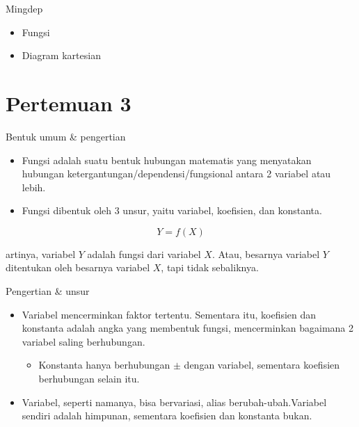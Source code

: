 \documentclass[
  ignorenonframetext,
]{beamer}
\providecommand{\tightlist}{%
  \setlength{\itemsep}{0pt}\setlength{\parskip}{0pt}}\usepackage{longtable,booktabs,array}
\begin{document}
\begin{frame}{Mingdep}
\label{mingdep-1}
\begin{itemize}
\item
  Fungsi
\item
  Diagram kartesian
\end{itemize}
\end{frame}

\section{Pertemuan 3}\label{pertemuan-3}

\begin{frame}{Bentuk umum \& pengertian}
\label{bentuk-umum-pengertian}
\begin{itemize}
\item
  Fungsi adalah suatu bentuk hubungan matematis yang menyatakan hubungan
  ketergantungan/dependensi/fungsional antara 2 variabel atau lebih.
\item
  Fungsi dibentuk oleh 3 unsur, yaitu variabel, koefisien, dan
  konstanta.
\end{itemize}

\[
Y=f(X)
\]

artinya, variabel \(Y\) adalah fungsi dari variabel \(X\). Atau,
besarnya variabel \(Y\) ditentukan oleh besarnya variabel \(X\), tapi
tidak sebaliknya.
\end{frame}

\begin{frame}{Pengertian \& unsur}
\label{pengertian-unsur}
\begin{itemize}
\item
  Variabel mencerminkan faktor tertentu. Sementara itu, koefisien dan
  konstanta adalah angka yang membentuk fungsi, mencerminkan bagaimana 2
  variabel saling berhubungan.

  \begin{itemize}
  \tightlist
  \item
    Konstanta hanya berhubungan \(\pm\) dengan variabel, sementara
    koefisien berhubungan selain itu.
  \end{itemize}
\item
  Variabel, seperti namanya, bisa bervariasi, alias
  berubah-ubah.Variabel sendiri adalah himpunan, sementara koefisien dan
  konstanta bukan.
\end{itemize}
\end{frame}
\end{document}
